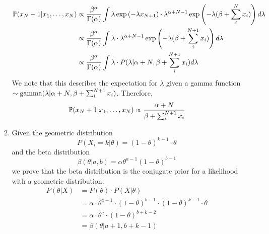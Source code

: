 \documentclass{article}
\begin{document}
\begin{enumerate}
\begin{enumerate}
\begin{align*}
                    \mathbb{P}(x_N+1|x_1,\hdots,x_N) &\propto \frac{\beta^\alpha}{\Gamma(\alpha)}
                        \int\lambda \exp\left(-\lambda x_{N+1}\right)
                        \cdot\lambda^{\alpha+N-1}\exp\left(-\lambda(\beta+\sum_i^{N}x_i)\right) d\lambda\\
                    &\propto  \frac{\beta^\alpha}{\Gamma(\alpha)} \int\lambda 
                        \cdot\lambda^{\alpha+N-1}\exp\left(-\lambda(\beta+\sum_i^{N+1}x_i)\right) d\lambda\\
                    &\propto  \frac{\beta^\alpha}{\Gamma(\alpha)} \int\lambda 
                        \cdot P(\lambda|\alpha+N,\beta+\sum_i^{N+1}x_i) d\lambda
               \end{align*}                        
                    We note that this describes the expectation for \(\lambda\) given a
                    gamma function \(\sim \textnormal{gamma}(\lambda|\alpha+N, \beta+\sum_i^{N+1}x_i)\).
                    Therefore,
               \begin{equation*}
                   \mathbb{P}(x_N+1|x_1,\hdots,x_N) \propto \frac{\alpha+N}{\beta+\sum_i^{N+1}x_i}
               \end{equation*}                   
            \item %
                Given the geometric distribution
                \begin{equation*}
                    P(X_i=k|\theta)= (1-\theta)^{k-1} \cdot \theta
                \end{equation*}
                and the beta distribution
                \begin{equation*}
                    \beta(\theta|a,b)= \alpha \theta^{a-1} (1-\theta)^{b-1}
                \end{equation*}
                we prove that the beta distribution is the conjugate prior
                for a likelihood with a geometric distribution.
                \begin{align*}
                    P(\theta|X)
                    &= P(\theta) \cdot P(X|\theta) \\
                    &= \alpha \cdot \theta^{a-1} \cdot (1-\theta)^{b-1} 
                        \cdot (1-\theta)^{k-1} \cdot \theta \\
                    &= \alpha \cdot \theta^{a} \cdot (1-\theta)^{b+k-2} \\
                    &= \beta(\theta|a+1, b+k-1) 
                \end{align*}

\end{enumerate}
\end{enumerate}
\end{document}
